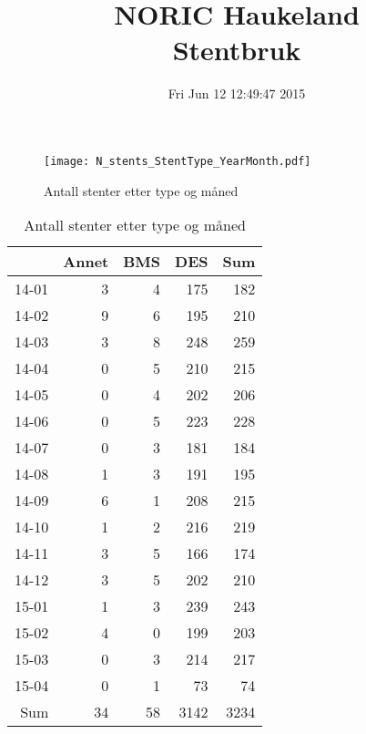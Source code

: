 \documentclass[presentation,xcolor=pdftex,dvipsnames,table]{beamer}
\title{NORIC Haukeland \\Stentbruk}\date{ Fri Jun 12 12:49:47 2015 }
\begin{document}
\maketitle



\begin{frame}
\begin{figure}
  \centering
  \caption{Antall stenter etter type og måned}
  

\texttt{[image: N\_stents\_StentType\_YearMonth.pdf]}
\end{figure}
\end{frame}



\begin{frame}
\begin{tiny}
\begin{table}[ht]
\centering
\begin{tabular}{rrrrr}
  \toprule
 & Annet & BMS & DES & Sum \\ 
  \midrule
14-01 & 3 & 4 & 175 & 182 \\ 
  14-02 & 9 & 6 & 195 & 210 \\ 
  14-03 & 3 & 8 & 248 & 259 \\ 
  14-04 & 0 & 5 & 210 & 215 \\ 
  14-05 & 0 & 4 & 202 & 206 \\ 
  14-06 & 0 & 5 & 223 & 228 \\ 
  14-07 & 0 & 3 & 181 & 184 \\ 
  14-08 & 1 & 3 & 191 & 195 \\ 
  14-09 & 6 & 1 & 208 & 215 \\ 
  14-10 & 1 & 2 & 216 & 219 \\ 
  14-11 & 3 & 5 & 166 & 174 \\ 
  14-12 & 3 & 5 & 202 & 210 \\ 
  15-01 & 1 & 3 & 239 & 243 \\ 
  15-02 & 4 & 0 & 199 & 203 \\ 
  15-03 & 0 & 3 & 214 & 217 \\ 
  15-04 & 0 & 1 & 73 & 74 \\ 
  Sum & 34 & 58 & 3142 & 3234 \\ 
   \bottomrule
\end{tabular}
\caption{Antall stenter etter type og måned} 
\end{table}\end{tiny}
\end{frame}
\end{document}
